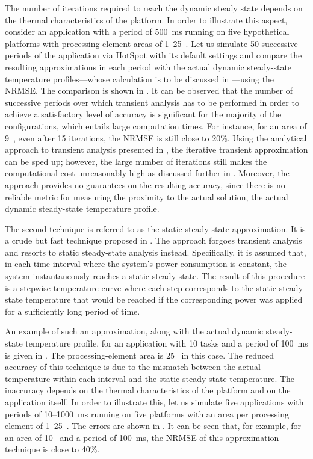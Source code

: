 The number of iterations required to reach the dynamic steady state depends on
the thermal characteristics of the platform. In order to illustrate this aspect,
consider an application with a period of 500~ms running on five hypothetical
platforms with processing-element areas of 1--25~. Let us simulate
50 successive periods of the application via HotSpot with its default settings
and compare the resulting approximations in each period with the actual dynamic
steady-state temperature profiles---whose calculation is to be discussed in
---using the \ac{NRMSE}. The comparison is shown
in . It can be observed that the number
of successive periods over which transient analysis has to be performed in order
to achieve a satisfactory level of accuracy is significant for the majority of
the configurations, which entails large computation times. For instance, for an
area of 9~, even after 15 iterations, the \ac{NRMSE} is still close
to 20\%. Using the analytical approach to transient analysis presented in
, the iterative transient approximation can be sped up;
however, the large number of iterations still makes the computational cost
unreasonably high as discussed further in .
Moreover, the approach provides no guarantees on the resulting accuracy, since
there is no reliable metric for measuring the proximity to the actual solution,
the actual dynamic steady-state temperature profile.

The second technique is referred to as the static steady-state approximation. It
is a crude but fast technique proposed in \cite{huang2009b}. The approach
forgoes transient analysis and resorts to static steady-state analysis instead.
Specifically, it is assumed that, in each time interval where the system's power
consumption is constant, the system instantaneously reaches a static steady
state. The result of this procedure is a stepwise temperature curve where each
step corresponds to the static steady-state temperature that would be reached if
the corresponding power was applied for a sufficiently long period of time.

An example of such an approximation, along with the actual dynamic steady-state
temperature profile, for an application with 10 tasks and a period of 100~ms is
given in . The processing-element area is
25~ in this case. The reduced accuracy of this technique is due to
the mismatch between the actual temperature within each interval and the static
steady-state temperature. The inaccuracy depends on the thermal characteristics
of the platform and on the application itself. In order to illustrate this, let
us simulate five applications with periods of 10--1000~ms running on five
platforms with an area per processing element of 1--25~. The errors
are shown in . It can be seen that, for
example, for an area of 10~ and a period of 100~ms, the \ac{NRMSE}
of this approximation technique is close to 40\%.

